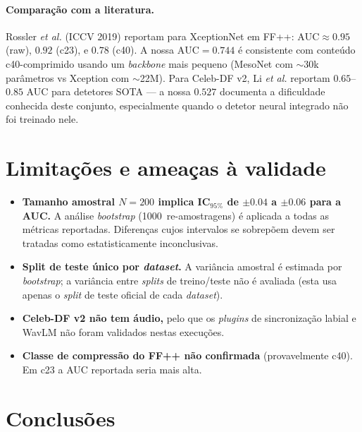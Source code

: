 \paragraph{Comparação com a literatura.}
Rossler \emph{et al.} (ICCV 2019) reportam para XceptionNet em FF++:
$\mathrm{AUC} \approx 0.95$ (raw), $0.92$ (c23), e $0.78$ (c40). A nossa
$\mathrm{AUC}=0.744$ é consistente com conteúdo c40-comprimido usando um
\emph{backbone} mais pequeno (MesoNet com $\sim$30k parâmetros vs Xception
com $\sim$22M). Para Celeb-DF v2, Li \emph{et al.} reportam $0.65$--$0.85$
AUC para detetores SOTA --- a nossa $0.527$ documenta a dificuldade conhecida
deste conjunto, especialmente quando o detetor neural integrado não foi
treinado nele.

\section{Limitações e ameaças à validade}
\label{sec:bench:limitations}

\begin{itemize}
  \item \textbf{Tamanho amostral $N=200$ implica IC$_{95\%}$ de $\pm 0.04$ a $\pm 0.06$ para a AUC.}
        A análise \emph{bootstrap} (1000~re-amostragens) é aplicada a todas
        as métricas reportadas. Diferenças cujos intervalos se sobrepõem
        devem ser tratadas como estatisticamente inconclusivas.
  \item \textbf{Split de teste único por \emph{dataset}.} A variância
        amostral é estimada por \emph{bootstrap}; a variância entre
        \emph{splits} de treino/teste não é avaliada (esta usa apenas o
        \emph{split} de teste oficial de cada \emph{dataset}).
  \item \textbf{Celeb-DF v2 não tem áudio,} pelo que os \emph{plugins} de
        sincronização labial e WavLM não foram validados nestas execuções.
  \item \textbf{Classe de compressão do FF++ não confirmada} (provavelmente
        c40). Em c23 a AUC reportada seria mais alta.
\end{itemize}

\section{Conclusões}
\label{sec:bench:conclusion}

